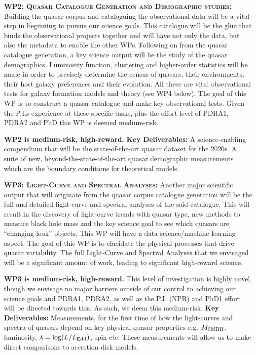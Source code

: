 \smallskip
\smallskip
\noindent
\textbf{\textsc{WP2: Quasar Catalogue Generation and Demographic studies:}}  
Building the quasar corpus and cataloguing the observational data will
be a vital step in beginning to pursue our science goals. This
catalogue will be the glue that binds the observational projects
together and will have not only the data, but also the metadata to
enable the other WPs.  Following on from the quasar catalogue
generation, a key science output will be the study of the quasar
demographics.  Luminosity function, clustering and higher-order
statistics will be made in order to precisely determine the census of
quasars, their environments, their host galaxy preferences and their
evolution. All these are vital observational tests for galaxy
formation models and theory (see WP4 below). The goal of this WP is to
construct a quasar catalogue and make key observational tests.
Given the P.I.s experience at these specific tasks, plus the effort
level of PDRA1, PDRA2 and PhD this WP is deemed medium-risk.

\smallskip
\smallskip
\noindent
{\bf WP2 is medium-risk, high-reward.}  {\bf Key Deliverables:} A
science-enabling compendium that will be the state-of-the-art quasar
dataset for the 2020s.  A suite of new, beyond-the-state-of-the-art
quasar demographic measurements which are the boundary conditions for
theoretical models.


\smallskip
\smallskip
\noindent
\textbf{\textsc{WP3: Light-Curve and Spectral Analyses:}} 
Another major scientific output that will originate from the quasar
corpus catalogue generation will be the full and detailed light-curve
and spectral analyses of the said catalogue. This will result in the
discovery of light-curve trends with quasar type, new methods to
measure black hole mass and the key science goal to see which quasars
are ``changing-look'' objects. This WP will have a data
science/machine learning aspect.  The goal of this WP is to elucidate
the physical processes that drive quasar variability.  The full
Light-Curve and Spectral Analyses that we envisaged will be a
significant amount of work, leading to significant high-reward
science.  

\smallskip
\smallskip
\noindent
{\bf WP3 is medium-risk, high-reward.}  
This level of investigation is highly novel, though we envisage no
major barriers outside of our control to achieving our science goals
and PDRA1, PDRA2, as well as the P.I. (NPR) and PhD1 effort will be
directed towards this.
As such, we deem this medium-risk.  {\bf Key Deliverables:}
Measurements, for the first time of how the light-curves and spectra
of quasars depend on key physical quasar properties e.g. $M_{\rm
SMBH}$, luminosity, $\lambda = \log (L / L_{\rm Edd})$, spin etc.
These measurements will allow us to make direct comparisons to
accretion disk models.


